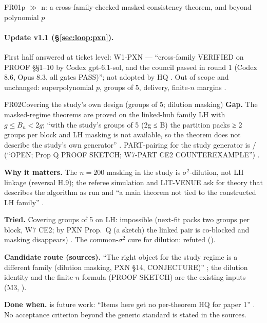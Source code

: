 \begin{card}{FR01}{p $\gg$ n: a cross-family-checked masked consistency theorem, and beyond polynomial $p$}
\paragraph{Update v1.1 (\S\ref{sec:loop:pxn}).} First half answered at ticket level: W1-PXN  — ``cross-family VERIFIED on PROOF §§1–10 by Codex gpt-6.1-sol, and the council passed in round 1 (Codex 8.6, Opus 8.3, all gates PASS)''; not adopted by HQ . Out of scope and unchanged: superpolynomial $p$, groups of 5, delivery, finite-$n$ margins .

\end{card}

\begin{card}{FR02}{Covering the study's own design (groups of 5; dilution masking)}
\textbf{Gap.} The masked-regime theorems are proved on the linked-hub family LH with $g\le B_n<2g$; ``with the study's groups of 5 (2g ≤ B) the partition packs ≥ 2 groups per block and LH masking is not available, so the theorem does not describe the study's own generator'' . PART-pairing for the study generator is  /  (``OPEN; Prop Q PROOF SKETCH; W7-PART CE2 COUNTEREXAMPLE'') .

\textbf{Why it matters.} The $n=200$ masking in the study is $\sigma^2$-dilution, not LH linkage (reversal H.9); the referee simulation and LIT-VENUE ask for theory that describes the algorithm as run and ``a main theorem not tied to the constructed LH family'' .

\textbf{Tried.} Covering groups of 5 on LH: impossible (next-fit packs two groups per block, W7 CE2; by PXN Prop.~Q (a sketch) the linked pair is co-blocked and masking disappears) . The common-$\sigma^2$ cure for dilution: refuted ().

\textbf{Candidate route (sources).} ``The right object for the study regime is a different family (dilution masking, PXN §14, CONJECTURE)'' ; the dilution identity  and the finite-$n$ formula  (PROOF SKETCH) are the existing inputs (M3, ).

\textbf{Done when.}  is future work: ``Items here get no per-theorem HQ for paper 1'' . No acceptance criterion beyond the generic standard is stated in the sources.

\end{card}
